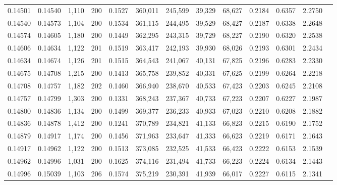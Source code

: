 \begin{tabular}{rrrrrrrrrrrrr}
0.14501 & 0.14540 & 1,110 & 200 &                                     0.1527 & 360,011 & 245,599 &  39,329 &  68,627 & 0.2184 & 0.6357 & 2.2750 \\
0.14540 & 0.14573 & 1,104 & 200 &                                     0.1534 & 361,115 & 244,495 &  39,529 &  68,427 & 0.2187 & 0.6338 & 2.2648 \\
0.14574 & 0.14605 & 1,180 & 200 &                                     0.1449 & 362,295 & 243,315 &  39,729 &  68,227 & 0.2190 & 0.6320 & 2.2538 \\
0.14606 & 0.14634 & 1,122 & 201 &                                     0.1519 & 363,417 & 242,193 &  39,930 &  68,026 & 0.2193 & 0.6301 & 2.2434 \\
0.14634 & 0.14674 & 1,126 & 201 &                                     0.1515 & 364,543 & 241,067 &  40,131 &  67,825 & 0.2196 & 0.6283 & 2.2330 \\
0.14675 & 0.14708 & 1,215 & 200 &                                     0.1413 & 365,758 & 239,852 &  40,331 &  67,625 & 0.2199 & 0.6264 & 2.2218 \\
0.14708 & 0.14757 & 1,182 & 202 &                                     0.1460 & 366,940 & 238,670 &  40,533 &  67,423 & 0.2203 & 0.6245 & 2.2108 \\
0.14757 & 0.14799 & 1,303 & 200 &                                     0.1331 & 368,243 & 237,367 &  40,733 &  67,223 & 0.2207 & 0.6227 & 2.1987 \\
0.14800 & 0.14836 & 1,134 & 200 &                                     0.1499 & 369,377 & 236,233 &  40,933 &  67,023 & 0.2210 & 0.6208 & 2.1882 \\
0.14836 & 0.14878 & 1,412 & 200 &                                     0.1241 & 370,789 & 234,821 &  41,133 &  66,823 & 0.2215 & 0.6190 & 2.1752 \\
0.14879 & 0.14917 & 1,174 & 200 &                                     0.1456 & 371,963 & 233,647 &  41,333 &  66,623 & 0.2219 & 0.6171 & 2.1643 \\
0.14917 & 0.14962 & 1,122 & 200 &                                     0.1513 & 373,085 & 232,525 &  41,533 &  66,423 & 0.2222 & 0.6153 & 2.1539 \\
0.14962 & 0.14996 & 1,031 & 200 &                                     0.1625 & 374,116 & 231,494 &  41,733 &  66,223 & 0.2224 & 0.6134 & 2.1443 \\
0.14996 & 0.15039 & 1,103 & 206 &                                     0.1574 & 375,219 & 230,391 &  41,939 &  66,017 & 0.2227 & 0.6115 & 2.1341 \\

\end{tabular}
